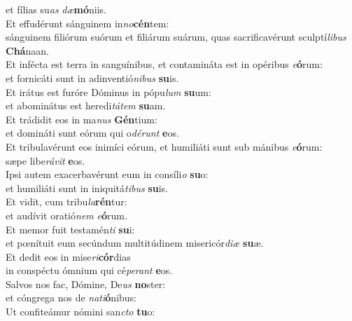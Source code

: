 \oddverse et fílias su\textit{as} \textit{dæ}\textbf{mó}niis.\\
\evenverse Et effudérunt sánguinem in\textit{no}\textbf{cén}tem:~\*\\
\evenverse sánguinem filiórum suórum et filiárum suárum, quas sacrificavérunt sculptí\textit{li}\textit{bus} \textbf{Chá}naan.\\
\oddverse Et infécta est terra in sanguínibus, et contamináta est in opéribus \textit{e}\textbf{ó}rum:~\*\\
\oddverse et fornicáti sunt in adinventió\textit{ni}\textit{bus} \textbf{su}is.\\
\evenverse Et irátus est furóre Dóminus in pópu\textit{lum} \textbf{su}um:~\*\\
\evenverse et abominátus est heredi\textit{tá}\textit{tem} \textbf{su}am.\\
\oddverse Et trádidit eos in ma\textit{nus} \textbf{Gén}tium:~\*\\
\oddverse et domináti sunt eórum qui o\textit{dé}\textit{runt} \textbf{e}os.\\
\evenverse Et tribulavérunt eos inimíci eórum, et humiliáti sunt sub mánibus \textit{e}\textbf{ó}rum:~\*\\
\evenverse sæpe libe\textit{rá}\textit{vit} \textbf{e}os.\\
\oddverse Ipsi autem exacerbavérunt eum in consíli\textit{o} \textbf{su}o:~\*\\
\oddverse et humiliáti sunt in iniquitá\textit{ti}\textit{bus} \textbf{su}is.\\
\evenverse Et vidit, cum tribu\textit{la}\textbf{rén}tur:~\*\\
\evenverse et audívit oratió\textit{nem} \textit{e}\textbf{ó}rum.\\
\oddverse Et memor fuit testamén\textit{ti} \textbf{su}i:~\*\\
\oddverse et pœnítuit eum secúndum multitúdinem misericór\textit{di}\textit{æ} \textbf{su}æ.\\
\evenverse Et dedit eos in mise\textit{ri}\textbf{cór}dias~\*\\
\evenverse in conspéctu ómnium qui cé\textit{pe}\textit{rant} \textbf{e}os.\\
\oddverse Salvos nos fac, Dómine, De\textit{us} \textbf{no}ster:~\*\\
\oddverse et cóngrega nos de \textit{na}\textit{ti}\textbf{ó}nibus:\\
\evenverse Ut confiteámur nómini san\textit{cto} \textbf{tu}o:~\*\\
